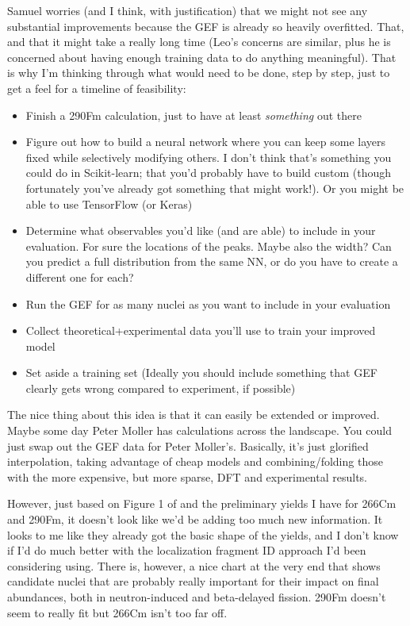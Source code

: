 Samuel worries (and I think, with justification) that we might not see any substantial improvements because the GEF is already so heavily overfitted. That, and that it might take a really long time (Leo's concerns are similar, plus he is concerned about having enough training data to do anything meaningful). That is why I'm thinking through what would need to be done, step by step, just to get a feel for a timeline of feasibility:
\begin{itemize}
	\item Finish a 290Fm calculation, just to have at least \textit{something} out there
	\item Figure out how to build a neural network where you can keep some layers fixed while selectively modifying others. I don't think that's something you could do in Scikit-learn; that you'd probably have to build custom (though fortunately you've already got something that might work!). Or you might be able to use TensorFlow (or Keras)
	\item Determine what observables you'd like (and are able) to include in your evaluation. For sure the locations of the peaks. Maybe also the width? Can you predict a full distribution from the same NN, or do you have to create a different one for each?
	\item Run the GEF for as many nuclei as you want to include in your evaluation
	\item Collect theoretical+experimental data you'll use to train your improved model
	\item Set aside a training set (Ideally you should include something that GEF clearly gets wrong compared to experiment, if possible)
\end{itemize}

The nice thing about this idea is that it can easily be extended or improved. Maybe some day Peter Moller has calculations across the landscape. You could just swap out the GEF data for Peter Moller's. Basically, it's just glorified interpolation, taking advantage of cheap models and combining/folding those with the more expensive, but more sparse, DFT and experimental results.

However, just based on Figure 1 of \cite{Vassh2018} and the preliminary yields I have for 266Cm and 290Fm, it doesn't look like we'd be adding too much new information. It looks to me like they already got the basic shape of the yields, and I don't know if I'd do much better with the localization fragment ID approach I'd been considering using. There is, however, a nice chart at the very end that shows candidate nuclei that are probably really important for their impact on final abundances, both in neutron-induced and beta-delayed fission. 290Fm doesn't seem to really fit but 266Cm isn't too far off.

